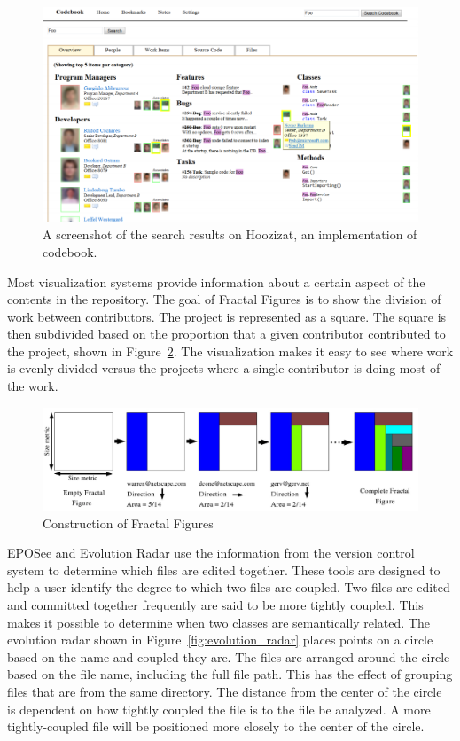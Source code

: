\begin{figure}[htpb]
  \centering
  \includegraphics[width=0.8\linewidth]{Figures/introduction/codebook.png}
  \caption{A screenshot of the search results on Hoozizat, an
    implementation of codebook.}
  \label{fig:codebook}
\end{figure}

Most visualization systems provide information about a certain aspect of
the contents in the repository. The goal of Fractal
Figures\cite{Ambros2005} is to show the division of work between
contributors. The project is represented as a square. The square is then
subdivided based on the proportion that a given contributor contributed
to the project, shown in Figure~\ref{fig:fractal_figures}. The
visualization makes it easy to see where work is evenly divided versus
the projects where a single contributor is doing most of the work.

\begin{figure}[htpb]
  \centering
  \includegraphics[width=0.8\linewidth]{Figures/introduction/fractal_figures.png}
  \caption{Construction of Fractal Figures}
  \label{fig:fractal_figures}
\end{figure}

EPOSee\cite{Burch2005} and Evolution Radar\cite{Ambros2009} use the
information from the version control system to determine which files
are edited together.
These tools  are designed to help a user identify the degree to which
two files are coupled.
Two files are edited and committed together frequently are said to be
more tightly coupled.
This makes it possible to determine when two classes are semantically
related.
The evolution radar shown in Figure~\ref{fig:evolution_radar} places
points on a circle based on the name and coupled they are.
The files are arranged around the circle
based on the file name, including the full file path. This has the
effect of grouping files that are from the same directory. The distance
from the center of the circle is dependent on how tightly coupled the
file is to the file be analyzed. A more tightly-coupled file will be
positioned more closely to the center of the circle.


